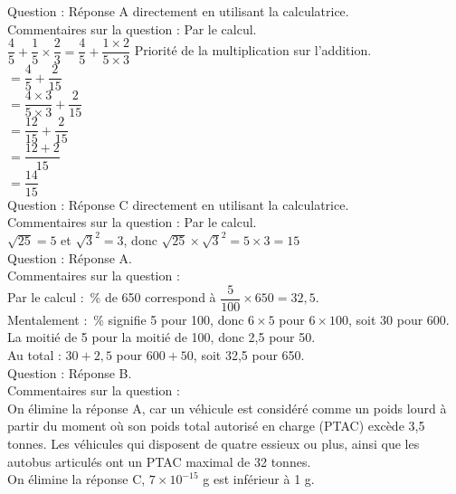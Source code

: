 
\medskip


Question  : Réponse A directement en utilisant la calculatrice. \\
Commentaires sur la question  : Par le calcul.\\[2mm]
$\dfrac{4}{5} + \dfrac{1}{5}\times \dfrac{2}{3}=\dfrac{4}{5} + \dfrac{1\times2}{5\times 3}$ \quad Priorité de la multiplication sur l'addition. \\[2mm]
 $=\dfrac{4}{5} + \dfrac{2}{15}$ \\[2mm]
 $=\dfrac{4\times 3}{5\times 3} + \dfrac{2}{15}$  \\[2mm]
 $=\dfrac{12}{15} + \dfrac{2}{15}$  \\[2mm]
 $=\dfrac{12+2}{15}$  \\[2mm]
 $=\dfrac{14}{15}$  \\[2mm]

Question  : Réponse C directement en utilisant la calculatrice.\\
Commentaires sur la question  : Par le calcul.\\[2mm]
$\sqrt{25}=5$ et $\sqrt{3}^2 =3$, donc $\sqrt{25} \times \sqrt{3}^2 =5 \times 3=15$ \\

Question  : Réponse A.\\
Commentaires sur la question  : \\
Par le calcul : \,\% de 650 correspond à $\dfrac{5}{100}\times650=32,5$. \\[2mm]
Mentalement : \,\% signifie 5 pour 100, donc $6\times5$ pour $6\times100$, soit 30 pour 600. \\
\phantom{Mentalement : \quad} La moitié de 5 pour la moitié de 100, donc 2,5 pour 50.\\
Au total : $30+2,5$ pour $600+50$, soit 32,5 pour 650. \\

Question  : Réponse B.\\
Commentaires sur la question  : \\
On élimine la réponse A, car un véhicule est considéré comme un poids lourd à partir du moment où son poids total autorisé en charge (PTAC) excède 3,5 tonnes. Les véhicules qui disposent de quatre essieux ou plus, ainsi que les autobus articulés ont un PTAC maximal de 32 tonnes. \\
On élimine la réponse C, $7 \times 10^{-15}$ g est inférieur à 1 g.

\medskip

\vspace{0,5cm}

